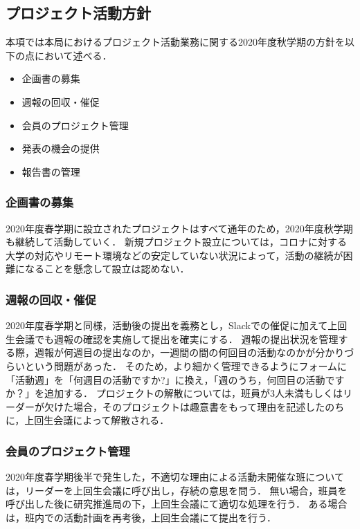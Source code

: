 \subsection*{プロジェクト活動方針}


本項では本局におけるプロジェクト活動業務に関する2020年度秋学期の方針を以下の点において述べる．

\begin{itemize}
\item 企画書の募集
\item 週報の回収・催促
\item 会員のプロジェクト管理
\item 発表の機会の提供
\item 報告書の管理
\end{itemize}

\subsubsection*{企画書の募集}

2020年度春学期に設立されたプロジェクトはすべて通年のため，2020年度秋学期も継続して活動していく．
新規プロジェクト設立については，コロナに対する大学の対応やリモート環境などの安定していない状況によって，活動の継続が困難になることを懸念して設立は認めない．

\subsubsection*{週報の回収・催促}

2020年度春学期と同様，活動後の提出を義務とし，Slackでの催促に加えて上回生会議でも週報の確認を実施して提出を確実にする．
週報の提出状況を管理する際，週報が何週目の提出なのか，一週間の間の何回目の活動なのかが分かりづらいという問題があった．
そのため，より細かく管理できるようにフォームに「活動週」を「何週目の活動ですか?」に換え，「週のうち，何回目の活動ですか？」を追加する．
プロジェクトの解散については，班員が3人未満もしくはリーダーが欠けた場合，そのプロジェクトは趣意書をもって理由を記述したのちに，上回生会議によって解散される．

\subsubsection*{会員のプロジェクト管理}

2020年度春学期後半で発生した，不適切な理由による活動未開催な班については，リーダーを上回生会議に呼び出し，存続の意思を問う．
無い場合，班員を呼び出した後に研究推進局の下，上回生会議にて適切な処理を行う．
ある場合は，班内での活動計画を再考後，上回生会議にて提出を行う．

